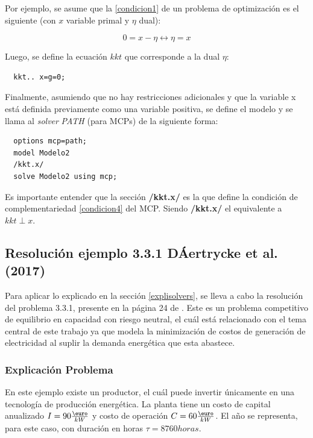 Por ejemplo, se asume que la \ref{condicion1} de un problema de optimización es el siguiente (con $x$ variable primal y $\eta$ dual):

$$0=x-\eta \leftrightarrow \eta=x$$

Luego, se define la ecuación $kkt$ que corresponde a la dual $\eta$:

\begin{lstlisting}
  kkt.. x=g=0;
 \end{lstlisting}

Finalmente, asumiendo que no hay restricciones adicionales y que la variable x está definida previamente como una variable positiva, se define el modelo y se llama al \textit{solver} \textit{PATH} (para MCPs) de la siguiente forma:

\begin{lstlisting}
  options mcp=path;
  model Modelo2
  /kkt.x/
  solve Modelo2 using mcp;
\end{lstlisting}

Es importante entender que la sección \textbf{/kkt.x/} es la que define la condición de complementariedad \ref{condicion4} del MCP. Siendo \textbf{/kkt.x/} el equivalente a  $kkt \perp x$. 

\subsection{Resolución ejemplo 3.3.1 DÁertrycke et al. (2017)}

Para aplicar lo explicado en la sección \ref{explisolvers}, se lleva a cabo la resolución del problema 3.3.1, presente en la página 24 de . Este es un problema competitivo de equilibrio en capacidad con riesgo neutral, el cuál está relacionado con el tema central de este trabajo ya que modela la minimización de costos de generación de electricidad al suplir la demanda energética que esta abastece. 
\vspace{2.5mm}

\subsubsection{Explicación Problema}
En este ejemplo existe un productor, el cuál puede invertir únicamente en una tecnología de producción energética. La planta tiene un costo de capital anualizado $I=90 \frac{\textup{\euro}}{kW}$ y costo de operación $C=60 \frac{\textup{\euro}}{kW}$. El año se representa, para este caso, con duración en horas $\tau = 8760 horas$. 
\vspace{2.5mm}

